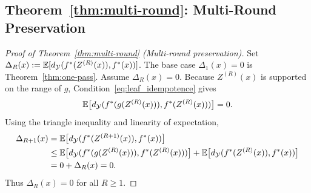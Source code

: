 

\subsection{Theorem~\ref{thm:multi-round}: Multi-Round Preservation}

\begin{proof}[Proof of Theorem~\ref{thm:multi-round} (Multi-round preservation)]
\label{proof:thm-multi-round}
Set $\Delta_R(x):=\mathbb{E}[d_{\mathcal{Y}}(f^{\ast}(Z^{(R)}(x)),f^{\ast}(x))]$. The base case $\Delta_1(x)=0$ is Theorem~\ref{thm:one-pass}. Assume $\Delta_R(x)=0$. Because $Z^{(R)}(x)$ is supported on the range of $g$, Condition~\eqref{eq:leaf_idempotence} gives
\[
\mathbb{E}\big[d_{\mathcal{Y}}(f^{\ast}(g(Z^{(R)}(x))),f^{\ast}(Z^{(R)}(x)))\big]=0.
\]
Using the triangle inequality and linearity of expectation,
\begin{align*}
\Delta_{R+1}(x)
&= \mathbb{E}\big[d_{\mathcal{Y}}(f^{\ast}(Z^{(R+1)}(x)),f^{\ast}(x))\big] \\
&\le \mathbb{E}\big[d_{\mathcal{Y}}(f^{\ast}(g(Z^{(R)}(x))),f^{\ast}(Z^{(R)}(x)))\big]
  + \mathbb{E}\big[d_{\mathcal{Y}}(f^{\ast}(Z^{(R)}(x)),f^{\ast}(x))\big] \\
&= 0 + \Delta_R(x) = 0.
\end{align*}
Thus $\Delta_R(x)=0$ for all $R\ge1$.
\end{proof}

